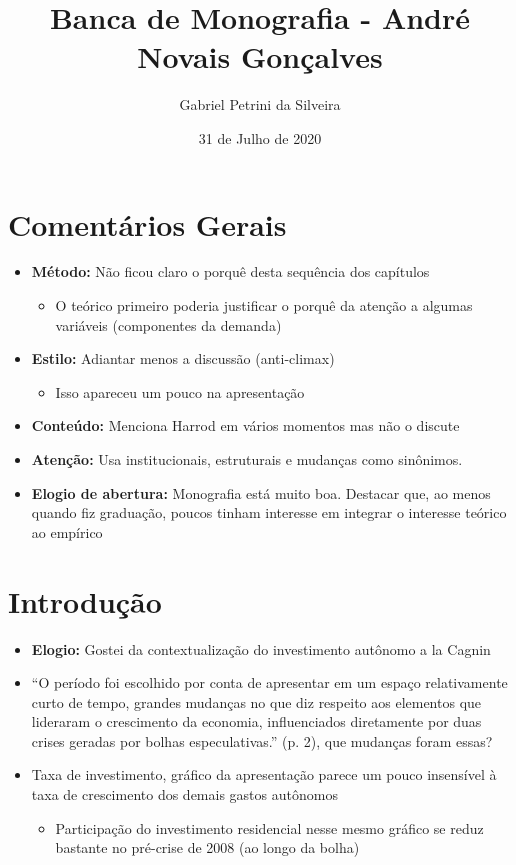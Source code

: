 \documentclass[11pt]{article}
\author{Gabriel Petrini da Silveira}
\date{31 de Julho de 2020}
\title{Banca de Monografia - André Novais Gonçalves}
\begin{document}
\maketitle
\tableofcontents



\section{Comentários Gerais}
\label{sec:org52ebe71}
\begin{itemize}
\item \textbf{Método:} Não ficou claro o porquê desta sequência dos capítulos
\begin{itemize}
\item O teórico primeiro poderia justificar o porquê da atenção a algumas variáveis (componentes da demanda)
\end{itemize}
\item \textbf{Estilo:} Adiantar menos a discussão (anti-climax)
\begin{itemize}
\item Isso apareceu um pouco na apresentação
\end{itemize}
\item \textbf{Conteúdo:} Menciona Harrod em vários momentos mas não o discute
\item \textbf{Atenção:} Usa institucionais, estruturais e mudanças como sinônimos.
\item \textbf{Elogio de abertura:} Monografia está muito boa. Destacar que, ao menos quando fiz graduação, poucos tinham interesse em integrar o interesse teórico ao empírico
\end{itemize}

\section{Introdução}
\label{sec:orgab0a571}

\begin{itemize}
\item \textbf{Elogio:} Gostei da contextualização do investimento autônomo a la Cagnin
\item ``O período foi escolhido por conta de apresentar em um espaço relativamente curto de tempo, grandes mudanças no que diz respeito aos elementos que lideraram o crescimento da economia, influenciados diretamente por duas crises geradas por bolhas especulativas.'' (p. 2), que mudanças foram essas?
\item Taxa de investimento, gráfico da apresentação parece um pouco insensível à taxa de crescimento dos demais gastos autônomos
\begin{itemize}
\item Participação do investimento residencial nesse mesmo gráfico se reduz bastante no pré-crise de 2008 (ao longo da bolha)
\end{itemize}
\end{itemize}
\end{document}
